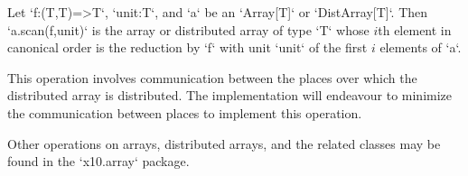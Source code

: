 Let \xcd`f:(T,T)=>T`, \xcd`unit:T`, and \xcd`a` be an \xcd`Array[T]` or
\xcd`DistArray[T]`.  Then \xcd`a.scan(f,unit)` is the array or distributed
array of type \xcd`T` whose {$i$}th element in canonical order is the
reduction by \xcd`f` with unit \xcd`unit` of the first {$i$} elements of
\xcd`a`. 


This operation involves communication between the places over which the
distributed array is distributed. The \Xten{} implementation will endeavour to
minimize the communication between places to implement this operation.

Other operations on arrays, distributed arrays, and the related classes may be
found in the \xcd`x10.array` package.
